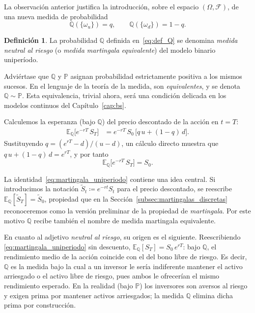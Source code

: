 \documentclass[11pt,a4paper,oneside]{report}
\theoremstyle{plain}
\theoremstyle{definition}
\newtheorem{definicion}[teorema]{Definición}
\theoremstyle{remark}
\newcommand{\E}{\mathbb{E}}
\newcommand{\PP}{\mathbb{P}}
\newcommand{\Q}{\mathbb{Q}}
\newcommand{\F}{\mathcal{F}}
\newcommand{\1}{\mathbf{1}}
\newcommand{\eqdef}{\coloneqq}
\begin{document}
La
observación anterior justifica la introducción, sobre el espacio
$(\Omega, \F)$, de una nueva medida de probabilidad
\begin{equation}\label{eq:def_Q}
  \Q(\{\omega_u\}) = q, \qquad \Q(\{\omega_d\}) = 1 - q.
\end{equation}

\begin{definicion}
\label{def:medida_riesgo}
La probabilidad $\Q$ definida en~\eqref{eq:def_Q} se denomina
\emph{medida neutral al riesgo} (o \emph{medida martingala
equivalente}) del modelo binario uniperíodo.
\end{definicion}

Adviértase que $\Q$ y $\PP$ asignan probabilidad estrictamente positiva
a los mismos sucesos. En el lenguaje de la teoría de la medida, son
\emph{equivalentes}, y se denota $\Q \sim \PP$. Esta equivalencia,
trivial ahora, será una condición delicada en los modelos continuos del
Capítulo~\ref{cap:bs}.

Calculemos la
esperanza (bajo $\Q$) del precio descontado de la acción en $t = T$:
\begin{align*}
  \E_{\Q}\bigl[e^{-rT}\, S_T\bigr]
  &= e^{-rT}\, S_0\,\bigl[q\, u + (1 - q)\, d\bigr].
\end{align*}
Sustituyendo $q = (e^{rT} - d)/(u - d)$, un cálculo directo muestra que
$q\, u + (1 - q)\, d = e^{rT}$, y por tanto
\begin{equation}\label{eq:martingala_uniperiodo}
  \E_{\Q}\bigl[e^{-rT}\, S_T\bigr] = S_0.
\end{equation}

La identidad~\eqref{eq:martingala_uniperiodo} contiene una idea central. Si introducimos la notación $\widetilde
S_t \eqdef e^{-rt} S_t$ para el precio descontado, se reescribe
$\E_{\Q}[\widetilde S_T] = \widetilde S_0$, propiedad que en la
Sección~\ref{subsec:martingalas_discretas} reconoceremos como la
versión preliminar de la propiedad de \emph{martingala}. Por este
motivo $\Q$ recibe también el nombre de medida martingala equivalente.

En cuanto al adjetivo \emph{neutral al riesgo}, su origen es el
siguiente. Reescribiendo \eqref{eq:martingala_uniperiodo} sin
descuento, $\E_\Q[S_T] = S_0\, e^{rT}$: bajo $\Q$, el rendimiento medio
de la acción coincide con el del bono libre de riesgo. Es decir, $\Q$
es la medida bajo la cual a un inversor le sería indiferente mantener
el activo arriesgado o el activo libre de riesgo, pues ambos le
ofrecerían el mismo rendimiento esperado. En la realidad (bajo $\PP$)
los inversores son aversos al riesgo y exigen prima por mantener
activos arriesgados; la medida $\Q$ elimina dicha prima por
construcción.
\end{document}
